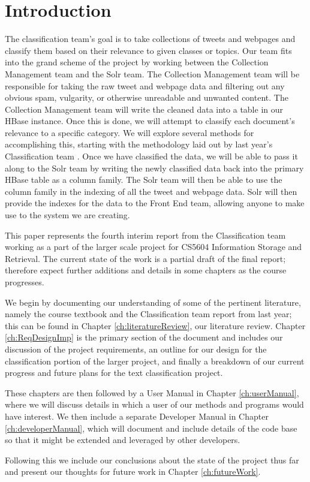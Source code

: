 \chapter{Introduction}\label{ch:introduction}

The classification team’s goal is to take collections of tweets and webpages and classify them based on their relevance to given classes or topics. Our team fits into the grand scheme of the project by working between the Collection Management team and the Solr team. The Collection Management team will be responsible for taking the raw tweet and webpage data and filtering out any obvious spam, vulgarity, or otherwise unreadable and unwanted content. The Collection Management team will write the cleaned data into a table in our HBase instance. Once this is done, we will attempt to classify each document's relevance to a specific category. We will explore several methods for accomplishing this, starting with the methodology laid out by last year's Classification team \cite{cui2015classification}. Once we have classified the data, we will be able to pass it along to the Solr team by writing the newly classified data back into the primary HBase table as a column family. The Solr team will then be able to use the column family in the indexing of all the tweet and webpage data. Solr will then provide the indexes for the data to the Front End team, allowing anyone to make use to the system we are creating.

This paper represents the fourth interim report from the Classification team working as a part of the larger scale project for CS5604 Information Storage and Retrieval. The current state of the work is a partial draft of the final report; therefore expect further additions and details in some chapters as the course progresses.

We begin by documenting our understanding of some of the pertinent literature, namely the course textbook and the Classification team report from last year; this can be found in Chapter \ref{ch:literatureReview}, our literature review. Chapter \ref{ch:ReqDesignImp} is the primary section of the document and includes our discussion of the project requirements, an outline for our design for the classification portion of the larger project, and finally a breakdown of our current progress and future plans for the text classification project.

These chapters are then followed by a User Manual in Chapter \ref{ch:userManual}, where we will discuss details in which a user of our methods and programs would have interest. We then include a separate Developer Manual in Chapter \ref{ch:developerManual}, which will document and include details of the code base so that it might be extended and leveraged by other developers.

Following this we include our conclusions about the state of the project thus far and present our thoughts for future work in Chapter \ref{ch:futureWork}.
